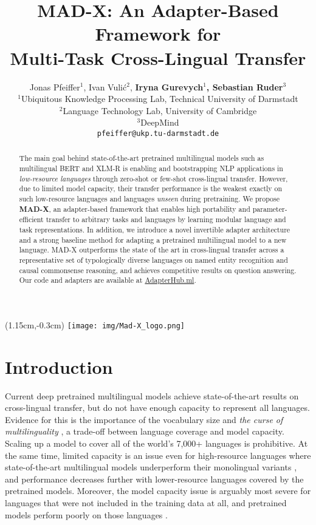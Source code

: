 \documentclass[11pt,a4paper]{article}
\title{MAD-X: An Adapter-Based Framework for\\Multi-Task Cross-Lingual Transfer}
\author{Jonas Pfeiffer$^{1}$, Ivan Vuli\'{c}$^{2}$, {\bf Iryna Gurevych$^{1}$, Sebastian Ruder$^{3}$ } \\
$^1$Ubiquitous Knowledge Processing Lab, 
  Technical University of Darmstadt \\
$^2$Language Technology Lab, University of Cambridge \hspace{0.5em} \\
$^3$DeepMind \\
\texttt{pfeiffer@ukp.tu-darmstadt.de} \\
}
\date{}
\newcommand{\model}[1]{\textsc{MAD-X}}
\begin{document}
\maketitle
\begin{abstract}
The main goal behind state-of-the-art pretrained multilingual models such as multilingual BERT and XLM-R is enabling and bootstrapping NLP applications in \textit{low-resource languages} through zero-shot or few-shot cross-lingual transfer. However, due to limited model capacity, their transfer performance is the weakest exactly on such low-resource languages and languages \textit{unseen} during pretraining. We propose \textbf{\model{}}, an adapter-based framework that enables high portability and parameter-efficient transfer to arbitrary tasks and languages by learning modular language and task representations. In addition, we introduce a novel invertible adapter architecture and a strong baseline method for adapting a pretrained multilingual model to a new language. \model{} outperforms the state of the art in cross-lingual transfer across a representative set of typologically diverse languages on named entity recognition and causal commonsense reasoning, and achieves competitive results on question answering. Our code and adapters are available at \href{https://AdapterHub.ml}{AdapterHub.ml}.
\end{abstract}


\begin{textblock*}{4cm}(1.15cm,-0.3cm) \texttt{[image: img/Mad-X\_logo.png]}
\end{textblock*}

\section{Introduction}
\label{s:introduction}
Current deep pretrained multilingual models \cite{Devlin2019bert,Lample2019xlm} achieve state-of-the-art results on cross-lingual transfer, but do not have enough capacity to represent all languages. Evidence for this is the importance of the vocabulary size \cite{Artetxe2020cross-lingual} and \textit{the curse of multilinguality} \cite{Conneau2020xlm-r}, a trade-off between language coverage and model capacity. Scaling up a model to cover all of the world's 7,000+ languages is prohibitive. At the same time, limited capacity is an issue even for high-resource languages where state-of-the-art multilingual models underperform their monolingual variants \cite{Eisenschlos2019multifit,Virtanen:2019arxiv,Nozza:2020arxiv}, and performance decreases further with lower-resource languages covered by the pretrained models. Moreover, the model capacity issue is arguably most severe for languages that were not included in the training data at all, and pretrained models perform poorly on those languages \cite{Ponti2020factorization}.
\end{document}
